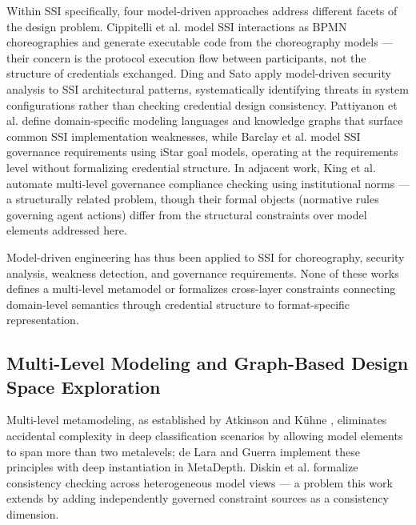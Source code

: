 Within SSI specifically, four model-driven approaches address different facets of the design problem. Cippitelli et al. \citep{cippitelli_chorssi_2024} model SSI interactions as BPMN choreographies and generate executable code from the choreography models --- their concern is the protocol execution flow between participants, not the structure of credentials exchanged. Ding and Sato \citep{ding_model-driven_2023} apply model-driven security analysis to SSI architectural patterns, systematically identifying threats in system configurations rather than checking credential design consistency. Pattiyanon et al. \citep{pattiyanonMethodDetectingCommon2022} define domain-specific modeling languages and knowledge graphs that surface common SSI implementation weaknesses, while Barclay et al. \citep{barclay_towards_2020} model SSI governance requirements using iStar goal models, operating at the requirements level without formalizing credential structure. In adjacent work, King et al. \citep{king_automated_2017} automate multi-level governance compliance checking using institutional norms --- a structurally related problem, though their formal objects (normative rules governing agent actions) differ from the structural constraints over model elements addressed here.

Model-driven engineering has thus been applied to SSI for choreography, security analysis, weakness detection, and governance requirements. None of these works defines a multi-level metamodel or formalizes cross-layer constraints connecting domain-level semantics through credential structure to format-specific representation.

\subsection{Multi-Level Modeling and Graph-Based Design Space Exploration}\label{multi-level-modeling-and-graph-based-design-space-exploration}

\label{sec:rw-multilevel}

Multi-level metamodeling, as established by Atkinson and Kühne \citep{goos_essence_2001, atkinson_reducing_2008}, eliminates accidental complexity in deep classification scenarios by allowing model elements to span more than two metalevels; de Lara and Guerra \citep{hutchison_deep_2010} implement these principles with deep instantiation in MetaDepth. Diskin et al. \citep{dingel_specifying_2011} formalize consistency checking across heterogeneous model views --- a problem this work extends by adding independently governed constraint sources as a consistency dimension.

